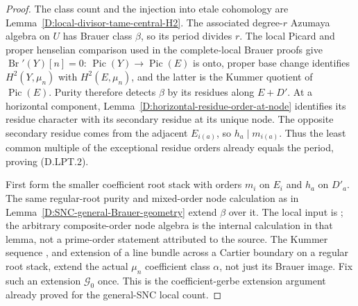 \begin{proof}
The class count and the injection into etale cohomology are
Lemma~\ref{D:local-divisor-tame-central-H2}.
The associated degree-$r$ Azumaya algebra on $U$ has Brauer class
$\beta$, so its period divides $r$. The local Picard and proper
henselian comparison used in the complete-local Brauer proofs give
$\operatorname{Br}'(Y)[n]=0$: $\operatorname{Pic}(Y)\to
\operatorname{Pic}(E)$ is onto, proper base change identifies
$H^2(Y,\mu_n)$ with $H^2(E,\mu_n)$, and the latter is the Kummer
quotient of $\operatorname{Pic}(E)$.
Purity therefore detects $\beta$ by its residues along $E+D'$.
At a horizontal component, Lemma~\ref{D:horizontal-residue-order-at-node}
identifies its residue character with its secondary residue at
its unique node. The opposite secondary residue comes from the
adjacent $E_{i(a)}$, so $h_a\mid m_{i(a)}$.
Thus the least common multiple of the exceptional residue orders
already equals the period, proving (D.LPT.2).

First form the smaller coefficient root stack with orders $m_i$
on $E_i$ and $h_a$ on $D'_a$. The same regular-root purity and
mixed-order node calculation as in
Lemma~\ref{D:SNC-general-Brauer-geometry} extend $\beta$ over it.
The local input is
\citep[Proposition~3.2.1, Lemma~4.3.1 and Propositions~4.3.2,
4.3.7]{Lieblich2011ResidualD}; the arbitrary composite-order node
algebra is the internal calculation in that lemma, not a
prime-order statement attributed to the source. The Kummer
sequence \citep[Lemma~59.28.1, Tag~03PK]{StacksBrauerZeroD},
and extension of a line bundle across a Cartier boundary
on a regular root stack, extend the actual $\mu_n$ coefficient
class $\alpha$, not just its Brauer image. Fix such an extension
$\mathcal G_0$ once. This is the coefficient-gerbe extension
argument already proved for the general-SNC local count.


\end{proof}

